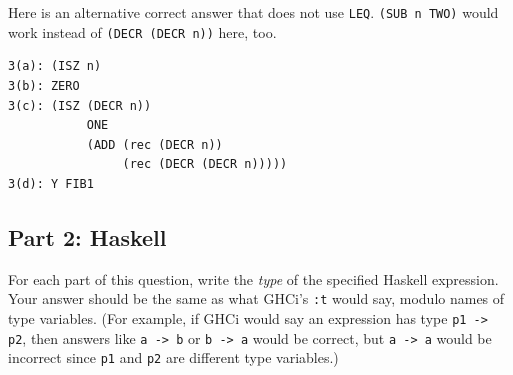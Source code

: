 \documentclass[addpoints]{exam}
\begin{document}
\begin{questions}
\begin{solution}
Here is an alternative correct answer that does not use \texttt{LEQ}.  \texttt{(SUB n TWO)} would work instead of \texttt{(DECR (DECR n))} here, too.
\begin{verbatim}
3(a): (ISZ n)
3(b): ZERO
3(c): (ISZ (DECR n))
           ONE
           (ADD (rec (DECR n))
                (rec (DECR (DECR n)))))
3(d): Y FIB1
\end{verbatim}
\end{solution}

\subsection*{\textbf{Part 2: Haskell}}

\question For each part of this question, write the \emph{type} of the specified Haskell expression.  Your answer should be the same as what GHCi's \texttt{:t} would say, modulo names of type variables.  (For example, if GHCi would say an expression has type \texttt{p1 -> p2}, then answers like \texttt{a -> b} or \texttt{b -> a} would be correct, but \texttt{a -> a} would be incorrect since \texttt{p1} and \texttt{p2} are different type variables.)

\end{questions}
\end{document}
